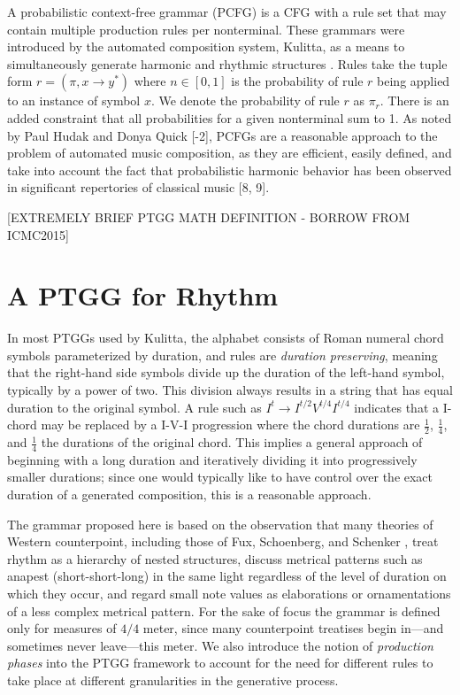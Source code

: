 \documentclass{article}
\begin{document}

A probabilistic context-free grammar (PCFG) is a CFG with a rule set that may contain multiple production rules per nonterminal. These grammars were introduced by the automated composition system, Kulitta, as a means to simultaneously generate harmonic and rhythmic structures \cite{quick_thesis}. Rules take the tuple form $r = (\pi, x \rightarrow y^{*})$ where $n \in [0,1]$ is the probability of rule $r$ being applied to an instance of symbol $x$. We denote the probability of rule $r$ as $\pi_r$. There is an added constraint that all probabilities for a given nonterminal sum to 1. As noted by Paul Hudak and Donya Quick [-2], PCFGs are a reasonable approach to the problem of automated music composition, as they are efficient, easily defined, and take into account the fact that probabilistic harmonic behavior has been observed in significant repertories of classical music [8, 9].



[EXTREMELY BRIEF PTGG MATH DEFINITION - BORROW FROM ICMC2015]

\section{A PTGG for Rhythm}


In most PTGGs used by Kulitta, the alphabet consists of Roman numeral chord symbols parameterized by duration, and rules are \emph{duration preserving}, meaning that the right-hand side symbols divide up the duration of the left-hand symbol, typically by a power of two. This division always results in a string that has equal duration to the original symbol. A rule such as $I^{t} \rightarrow I^{t/2} V^{t/4} I^{t/4}$ indicates that a I-chord may be replaced by a I-V-I progression where the chord durations are $\frac{1}{2}$, $\frac{1}{4}$, and $\frac{1}{4}$ the durations of the original chord. This implies a general approach of beginning with a long duration and iteratively dividing it into progressively smaller durations; since one would typically like to have control over the exact duration of a generated composition, this is a reasonable approach.


The grammar proposed here is based on the observation that many theories of Western counterpoint, including those of Fux, Schoenberg, and Schenker \cite{[TO-DO]}, treat rhythm as a hierarchy of nested structures, discuss metrical patterns such as anapest (short-short-long) in the same light regardless of the level of duration on which they occur, and regard small note values as elaborations or ornamentations of a less complex metrical pattern. For the sake of focus the grammar is defined only for measures of $4/4$ meter, since many counterpoint treatises begin in—and sometimes never leave—this meter. 
We also introduce the notion of \emph{production phases} into the PTGG framework to account for the need for different rules to take place at different granularities in the generative process.
\end{document}
